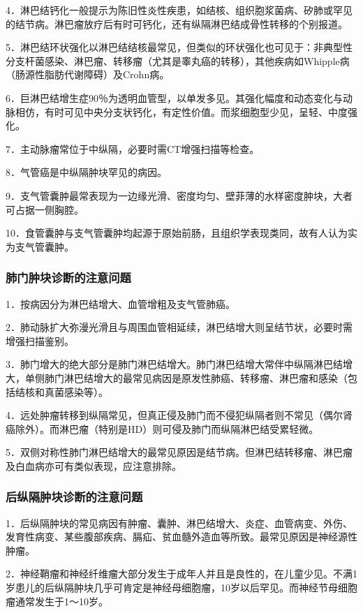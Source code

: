 4．淋巴结钙化一般提示为陈旧性炎性疾患，如结核、组织胞浆菌病、矽肺或罕见的结节病。淋巴瘤放疗后有时可钙化，还有纵隔淋巴结成骨性转移的个别报道。

5．淋巴结环状强化以淋巴结结核最常见，但类似的环状强化也可见于：非典型性分支杆菌感染、淋巴瘤、转移瘤（尤其是睾丸癌的转移），其他疾病如Whipple病（肠源性脂肪代谢障碍）及Crohn病。

6．巨淋巴结增生症90％为透明血管型，以单发多见。其强化幅度和动态变化与动脉相仿，有时可见中央分支状钙化，有定性价值。而浆细胞型少见，呈轻、中度强化。

7．主动脉瘤常位于中纵隔，必要时需CT增强扫描等检查。

8．气管癌是中纵隔肿块罕见的病因。

9．支气管囊肿最常表现为一边缘光滑、密度均匀、壁菲薄的水样密度肿块，大者可占据一侧胸腔。

10．食管囊肿与支气管囊肿均起源于原始前肠，且组织学表现类同，故有人认为实为支气管囊肿。

\subsubsection{肺门肿块诊断的注意问题}

1．按病因分为淋巴结增大、血管增粗及支气管肺癌。

2．肺动脉扩大弥漫光滑且与周围血管相延续，淋巴结增大则呈结节状，必要时需增强扫描鉴别。

3．肺门增大的绝大部分是肺门淋巴结增大。肺门淋巴结增大常伴中纵隔淋巴结增大，单侧肺门淋巴结增大的最常见病因是原发性肺癌、转移瘤、淋巴瘤和感染（包括结核和真菌感染等）。

4．远处肿瘤转移到纵隔常见，但真正侵及肺门而不侵犯纵隔者则不常见（偶尔肾癌除外）。而淋巴瘤（特别是HD）则可侵及肺门而纵隔淋巴结受累轻微。

5．双侧对称性肺门淋巴结增大的最常见原因是结节病。但淋巴结转移瘤、淋巴瘤及白血病亦可有类似表现，应注意排除。

\subsubsection{后纵隔肿块诊断的注意问题}

1．后纵隔肿块的常见病因有肿瘤、囊肿、淋巴结增大、炎症、血管病变、外伤、发育性病变、某些腹部疾病、膈疝、贫血髓外造血等所致。最常见原因是神经源性肿瘤。

2．神经鞘瘤和神经纤维瘤大部分发生于成年人并且是良性的，在儿童少见。不满1岁患儿的后纵隔肿块几乎可肯定是神经母细胞瘤，10岁以后罕见。而神经节母细胞瘤通常发生于1～10岁。

